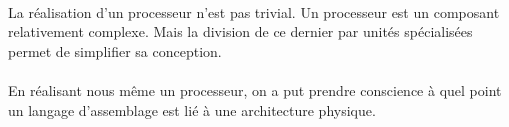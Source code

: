 \documentclass[a4paper]{article}
\begin{document}
		\paragraph{}{
		La réalisation d'un processeur n'est pas trivial. Un processeur est un 
		composant relativement complexe. Mais la division de ce dernier par unités
		spécialisées permet de simplifier sa conception. \newline
		}
		
		\paragraph{}{
		En réalisant nous même un processeur, on a put prendre conscience à 
		quel point un langage d'assemblage est lié à une architecture physique.
		}
		
	\newpage
	\listoffigures
		
\end{document}
